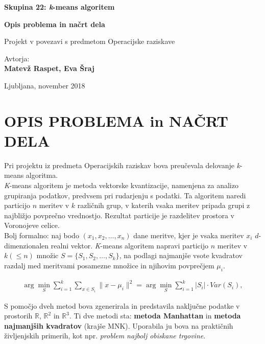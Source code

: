 \documentclass[11pt, a4paper]{article}
\begin{document}
\begin{titlepage}
\begin{center}

\Huge 
\textbf{Skupina 22: \textsl{k}-means algoritem}

\vspace{1cm}
\Large
\textbf{Opis problema in načrt dela}

\vspace{1cm}
\large
Projekt v povezavi s predmetom Operacijske raziskave


\vspace{2,5cm}
\large
Avtorja:\\
\textbf{Matevž Raspet, Eva Šraj}\\

\vfill

\Large Ljubljana, november 2018

\end{center}
\end{titlepage}

\newpage

\section{\textbf{OPIS PROBLEMA in NAČRT DELA}}

\noindent Pri projektu iz predmeta Operacijskih raziskav bova preučevala delovanje \textsl{k}-means algoritma. \\ 

\noindent \textsl{K}-means algoritem je metoda vektorske kvantizacije, namenjena za analizo grupiranja podatkov, predvsem pri rudarjenju s podatki. Ta algoritem naredi particijo $n$ meritev v $k$ različnih grup, v katerih vsaka meritev pripada grupi z najbližjo povprečno vrednostjo. Rezultat particije je razdelitev prostora v Voronojeve celice. \\
\noindent Bolj formalno: naj bodo $(x_1, x_2, \ldots,x_n)$ dane meritve, kjer je vsaka meritev $x_i$ $d$-dimenzionalen realni vektor. \textsl{K}-means algoritem napravi particijo $n$ meritev v $k  (\leq n)$ množic $S= \{S_1, S_2, \ldots, S_k\}$, na podlagi najmanjše vsote kvadratov razdalj med meritvami posamezne množice in njihovim povprečjem $\mu_i$.

\begin{align*}
\arg\min_{S} \sum_{i = 1}^k \sum_{x \in S_i} \| x - \mu_i \|^2 = \arg \min_{S} \sum_{i = 1}^k |S_i| \cdot Var(S_i),
\end{align*}


\noindent S pomočjo dveh metod bova zgenerirala in predstavila naključne podatke v prostorih $\mathbb{R}$, $\mathbb{R}^2$ in $\mathbb{R}^3$. Ti dve metodi sta: \textbf{metoda Manhattan} in \textbf{metoda najmanjših kvadratov} (krajše MNK). Uporabila ju bova na praktičnih življenjskih primerih, kot npr. \textsl{problem najbolj obiskane trgovine}. \\
\end{document}
